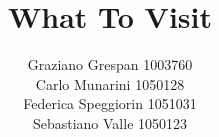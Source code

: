 \documentclass[
article,
10pt, %
a4paper, %
oneside, %
headinclude,footinclude, %
BCOR5mm, %
]{scrartcl}
\begin{document}
\begin{center}
\title{What To Visit}
\author{Graziano Grespan 1003760 \\
Carlo Munarini 1050128 \\
Federica Speggiorin 1051031 \\
Sebastiano Valle 1050123}
\end{center} %




\maketitle %

\setcounter{tocdepth}{2} %

\tableofcontents %

\listoffigures %

\listoftables %





\newpage %
\end{document}
